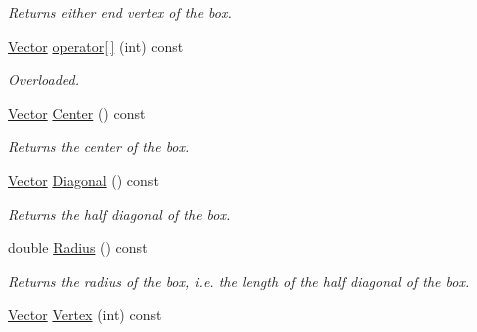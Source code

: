 \begin{DoxyCompactItemize}
\begin{DoxyCompactList}\small\item\em Returns either end vertex of the box. \item\end{DoxyCompactList}\item 
\hypertarget{class_box_ae638073ba0eb5b6cb7a1f9de3b9a7bd8}{
\hyperlink{class_vector}{Vector} \hyperlink{class_box_ae638073ba0eb5b6cb7a1f9de3b9a7bd8}{operator\mbox{[}$\,$\mbox{]}} (int) const }
\label{class_box_ae638073ba0eb5b6cb7a1f9de3b9a7bd8}

\begin{DoxyCompactList}\small\item\em Overloaded. \item\end{DoxyCompactList}\item 
\hypertarget{class_box_a44e2805cb2a7acaaa3937522fae56d23}{
\hyperlink{class_vector}{Vector} \hyperlink{class_box_a44e2805cb2a7acaaa3937522fae56d23}{Center} () const }
\label{class_box_a44e2805cb2a7acaaa3937522fae56d23}

\begin{DoxyCompactList}\small\item\em Returns the center of the box. \item\end{DoxyCompactList}\item 
\hypertarget{class_box_a3e077400dd38d177c39bcc711788eed9}{
\hyperlink{class_vector}{Vector} \hyperlink{class_box_a3e077400dd38d177c39bcc711788eed9}{Diagonal} () const }
\label{class_box_a3e077400dd38d177c39bcc711788eed9}

\begin{DoxyCompactList}\small\item\em Returns the half diagonal of the box. \item\end{DoxyCompactList}\item 
\hypertarget{class_box_a44dd9300bf9713c9190c3a1e69ef5728}{
double \hyperlink{class_box_a44dd9300bf9713c9190c3a1e69ef5728}{Radius} () const }
\label{class_box_a44dd9300bf9713c9190c3a1e69ef5728}

\begin{DoxyCompactList}\small\item\em Returns the radius of the box, i.e. the length of the half diagonal of the box. \item\end{DoxyCompactList}\item 
\hypertarget{class_box_a35f5775304c754981b8a38d141737880}{
\hyperlink{class_vector}{Vector} \hyperlink{class_box_a35f5775304c754981b8a38d141737880}{Vertex} (int) const }
\label{class_box_a35f5775304c754981b8a38d141737880}


\end{DoxyCompactItemize}
